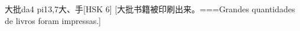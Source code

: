 \begin{EntryWithPhonetic}{大批}{da4 pi1}{3,7}{⼤、⼿}[HSK 6]
  [大批书籍被印刷出来。===Grandes quantidades de livros foram impressas.]
\end{EntryWithPhonetic}
